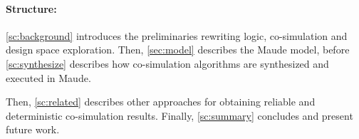 \paragraph{Structure:}
\cref{sc:background} introduces the preliminaries rewriting logic, co-simulation and design space exploration.
Then, \cref{sec:model} describes the Maude model, before \cref{sc:synthesize} describes how co-simulation algorithms are synthesized and executed in Maude.

Then, \cref{sc:related} describes other approaches for obtaining reliable and deterministic co-simulation results. 
Finally, \cref{sc:summary} concludes and present future work.